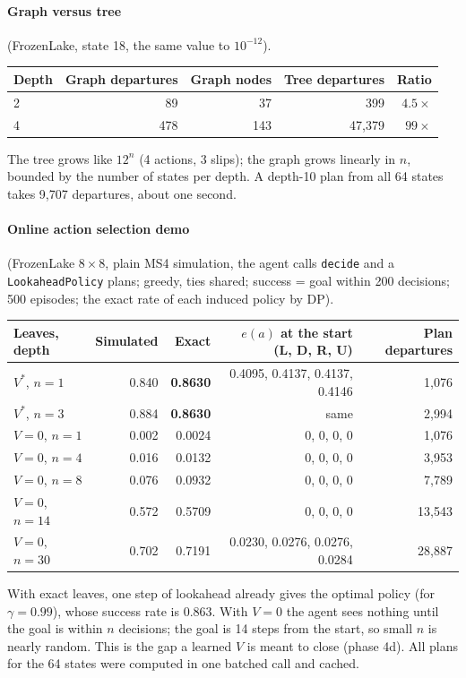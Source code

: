 \documentclass[11pt]{article}
\newcommand{\code}[1]{\texttt{#1}}
\theoremstyle{plain}
\begin{document}
\paragraph{Graph versus tree} (FrozenLake, state 18, the same value to $10^{-12}$).
\begin{center}
\small
\begin{tabular}{@{}lrrrr@{}}
\toprule
\textbf{Depth} & \textbf{Graph departures} & \textbf{Graph nodes} & \textbf{Tree departures} & \textbf{Ratio}\\
\midrule
2 & 89 & 37 & 399 & $4.5\times$\\
4 & 478 & 143 & 47{,}379 & $99\times$\\
\bottomrule
\end{tabular}
\end{center}
The tree grows like $12^n$ (4 actions, 3 slips); the graph grows linearly in $n$, bounded by the number of states per
depth. A depth-10 plan from all 64 states takes 9{,}707 departures, about one second.

\paragraph{Online action selection demo} (FrozenLake $8\times8$, plain MS4 simulation, the agent calls
\code{decide} and a \code{LookaheadPolicy} plans; greedy, ties shared; success = goal within 200 decisions; 500
episodes; the exact rate of each induced policy by DP).
\begin{center}
\small
\begin{tabular}{@{}lrrrr@{}}
\toprule
\textbf{Leaves, depth} & \textbf{Simulated} & \textbf{Exact} & \textbf{$e(a)$ at the start (L, D, R, U)} & \textbf{Plan departures}\\
\midrule
$V^*$, $n=1$ & 0.840 & \textbf{0.8630} & 0.4095, 0.4137, 0.4137, 0.4146 & 1{,}076\\
$V^*$, $n=3$ & 0.884 & \textbf{0.8630} & same & 2{,}994\\
$V=0$, $n=1$ & 0.002 & 0.0024 & 0, 0, 0, 0 & 1{,}076\\
$V=0$, $n=4$ & 0.016 & 0.0132 & 0, 0, 0, 0 & 3{,}953\\
$V=0$, $n=8$ & 0.076 & 0.0932 & 0, 0, 0, 0 & 7{,}789\\
$V=0$, $n=14$ & 0.572 & 0.5709 & 0, 0, 0, 0 & 13{,}543\\
$V=0$, $n=30$ & 0.702 & 0.7191 & 0.0230, 0.0276, 0.0276, 0.0284 & 28{,}887\\
\bottomrule
\end{tabular}
\end{center}
With exact leaves, one step of lookahead already gives the optimal policy (for $\gamma=0.99$), whose success rate is
0.863. With $V=0$ the agent sees nothing until the goal is within $n$ decisions; the goal is 14 steps from the start, so
small $n$ is nearly random. This is the gap a learned $V$ is meant to close (phase 4d). All plans for the 64 states
were computed in one batched call and cached.
\end{document}

